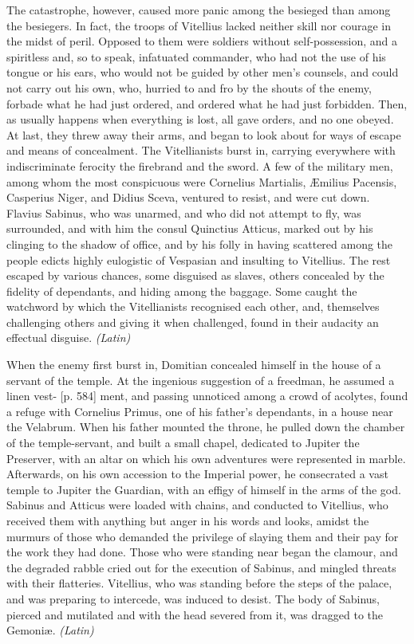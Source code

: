 The catastrophe, however, caused more panic among the besieged than among the besiegers. In fact, the troops of Vitellius lacked neither skill nor courage in the midst of peril. Opposed to them were soldiers without self-possession, and a spiritless and, so to speak, infatuated commander, who had not the use of his tongue or his ears, who would not be guided by other men's counsels, and could not carry out his own, who, hurried to and fro by the shouts of the enemy, forbade what he had just ordered, and ordered what he had just forbidden. Then, as usually happens when everything is lost, all gave orders, and no one obeyed. At last, they threw away their arms, and began to look about for ways of escape and means of concealment. The Vitellianists burst in, carrying everywhere with indiscriminate ferocity the firebrand and the sword. A few of the military men, among whom the most conspicuous were Cornelius Martialis, Æmilius Pacensis, Casperius Niger, and Didius Sceva, ventured to resist, and were cut down. Flavius Sabinus, who was unarmed, and who did not attempt to fly, was surrounded, and with him the consul Quinctius Atticus, marked out by his clinging to the shadow of office, and by his folly in having scattered among the people edicts highly eulogistic of Vespasian and insulting to Vitellius. The rest escaped by various chances, some disguised as slaves, others concealed by the fidelity of dependants, and hiding among the baggage. Some caught the watchword by which the Vitellianists recognised each other, and, themselves challenging others and giving it when challenged, found in their audacity an effectual disguise. \emph{(Latin)}


When the enemy first burst in, Domitian concealed himself in the house of a servant of the temple. At the ingenious suggestion of a freedman, he assumed a linen vest- [p. 584] ment, and passing unnoticed among a crowd of acolytes, found a refuge with Cornelius Primus, one of his father's dependants, in a house near the Velabrum. When his father mounted the throne, he pulled down the chamber of the temple-servant, and built a small chapel, dedicated to Jupiter the Preserver, with an altar on which his own adventures were represented in marble. Afterwards, on his own accession to the Imperial power, he consecrated a vast temple to Jupiter the Guardian, with an effigy of himself in the arms of the god. Sabinus and Atticus were loaded with chains, and conducted to Vitellius, who received them with anything but anger in his words and looks, amidst the murmurs of those who demanded the privilege of slaying them and their pay for the work they had done. Those who were standing near began the clamour, and the degraded rabble cried out for the execution of Sabinus, and mingled threats with their flatteries. Vitellius, who was standing before the steps of the palace, and was preparing to intercede, was induced to desist. The body of Sabinus, pierced and mutilated and with the head severed from it, was dragged to the Gemoniæ. \emph{(Latin)}

